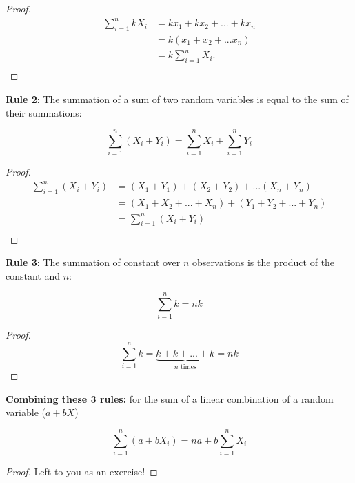 \documentclass{article}
\begin{document}
\begin{proof}
\begin{align*}
\sum_{i=1}^n kX_i &= k x_1 + kx_2 +...+ kx_n\\
&= k(x_1+x_2+...x_n)\\
&= k\sum_{i=1}^n X_i. \\
\end{align*}
\end{proof}

\clearpage 

\textbf{Rule 2}: The summation of a sum of two random variables is equal to the sum of their summations: 

\begin{equation*}
\sum_{i=1}^n (X_i+Y_i) = \sum_{i=1}^n X_i + \sum_{i=1}^n Y_i
\end{equation*}

\begin{proof}
\begin{align*}
\sum_{i=1}^n (X_i+Y_i) &=(X_1+Y_1) + (X_2+Y_2) + ... (X_n+Y_n)\\
&=(X_1+X_2+...+X_n) + (Y_1+Y_2+...+Y_n)\\
&=\sum_{i=1}^n (X_i+Y_i)\\
\end{align*}
\end{proof}

\textbf{Rule 3}: The summation of constant over $n$ observations is the product of the constant and $n$: 

\begin{equation*}
\sum_{i=1}^n k = nk
\end{equation*}

\begin{proof}

\begin{equation*}
\sum_{i=1}^n k = \underbrace{k + k + ... + k}_{n \text{ times}} = nk
\end{equation*}

\end{proof}

\textbf{Combining these 3 rules:} for the sum of a linear combination of a random variable ($a+bX$)

\begin{equation*}
\sum_{i=1}^n (a+bX_i) = na+b\sum_{i=1}^n X_i
\end{equation*}

\begin{proof}

Left to you as an exercise! 
\end{proof}
\end{document}
